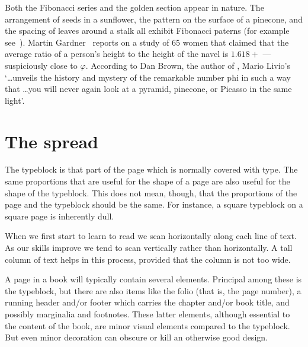 \documentclass[10pt,letterpaper,extrafontsizes]{memoir}
\begin{document}
    Both the Fibonacci series and the golden section appear in nature.
The arrangement of seeds in a sunflower, the pattern on the surface of a 
pinecone, and the spacing of leaves around a stalk all exhibit Fibonacci
paterns (for example see~\autocite{CONWAY96}). Martin Gardner~\autocite{GARDNER66}
reports on a study of 65 women that claimed that the average ratio of a 
person's height to the height of the navel is $1.618+$ --- suspiciously 
close to $\varphi$. According to Dan Brown, the author of 
, Mario Livio's 
~\autocite{LIVIO02} 
`\ldots unveils the history and mystery of the remarkable
number phi in such a way that \ldots you will never again look at a pyramid,
pinecone, or Picasso in the same light'.



\section{The spread} \label{sec:spread}

    The typeblock is that part of the page which is normally 
covered with type. The same proportions that are useful for the shape of a 
page are also useful for the shape of the typeblock. This does not mean, 
though, that the proportions of the page and the typeblock should be the same. 
For instance, a square typeblock on a square page is inherently dull.

    When we first start to learn to read we scan horizontally along each line
of text. As our skills improve we tend to scan vertically rather than
horizontally. A tall column of text helps in this process, 
provided that the column is not too wide.

    A page in a book will typically contain several elements. Principal
among these is the typeblock, but there are also items like 
the folio (that is, the page number), 
a running header and/or footer 
which carries the chapter 
and/or book title, and possibly marginalia and 
footnotes. These latter
elements, although essential to the content of the book, are minor visual
elements compared to the typeblock. 
But even minor decoration can obscure
or kill an otherwise good design.
\end{document}
